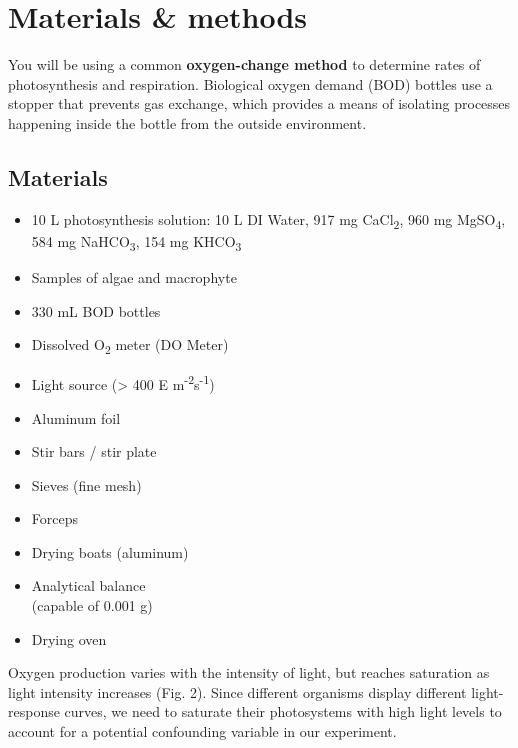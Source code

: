\documentclass[11pt,]{article}
\begin{document}
\bigskip

\pagebreak

\section{Materials \& methods}\label{materials-methods}

You will be using a common \textbf{oxygen-change method} to determine
rates of photosynthesis and respiration. Biological oxygen demand (BOD)
bottles use a stopper that prevents gas exchange, which provides a means
of isolating processes happening inside the bottle from the outside
environment.

\subsection{Materials}\label{materials}

\begin{multicols}{2}
\begin{itemize}{}
  \item 10 L photosynthesis solution: 10 L DI Water, 917 mg CaCl\textsubscript{2}, 960 mg MgSO\textsubscript{4}, 584 mg NaHCO\textsubscript{3}, 154 mg KHCO\textsubscript{3}
  \item Samples of algae and macrophyte
  \item 330 mL BOD bottles
  \item Dissolved O\textsubscript{2} meter (DO Meter)
  \item Light source (> 400 \textmu E m\textsuperscript{-2}s\textsuperscript{-1})
  \item Aluminum foil
  \item Stir bars / stir plate
  \item Sieves (fine mesh)
  \item Forceps
  \item Drying boats (aluminum)
  \item Analytical balance \\(capable of 0.001 g)
  \item Drying oven
\end{itemize}
\end{multicols}

Oxygen production varies with the intensity of light, but reaches
saturation as light intensity increases (Fig. 2). Since different
organisms display different light-response curves, we need to saturate
their photosystems with high light levels to account for a potential
confounding variable in our experiment. \pagebreak
\end{document}

